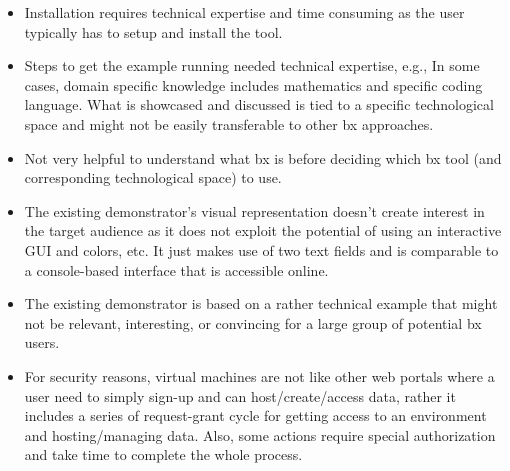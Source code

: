 \begin{itemize}
    \item {Installation requires technical expertise and time consuming as the user typically has to setup and install the tool.}

	\item {Steps to get the example running needed technical expertise, e.g., In some cases, domain specific knowledge includes mathematics and specific coding language. What is showcased and discussed is tied to a specific technological space and might not be easily transferable to other bx approaches.}
	
	\item {Not very helpful to understand what bx is before deciding which bx tool (and corresponding technological space) to use.}
	
	\item {The existing demonstrator's visual representation doesn't create interest in the target audience as it does not exploit the potential of using an interactive GUI and colors, etc. It just makes use of two text fields and is comparable to a console-based interface that is accessible online.}
	
	\item {The existing demonstrator is based on a rather technical example that might not be relevant, interesting, or convincing for a large group of potential bx users.}	
	
	\item {For security reasons, virtual machines are not like other web portals where a user need to simply sign-up and can host/create/access data, rather it includes a series of request-grant cycle for getting access to an environment and hosting/managing data. Also, some actions require special authorization and take time to complete the whole process.}

\end{itemize}
